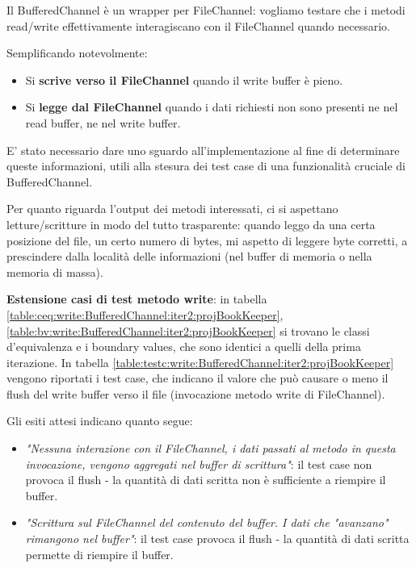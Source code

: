 \documentclass[10pt, a4paper]{article}
\newcommand{\gettablelabel}[5]{table:#1:#2:#3:iter#4:proj#5}
\def\bookkeeper{BookKeeper}
\begin{document}
	Il BufferedChannel è un wrapper per FileChannel: vogliamo testare che i metodi read/write effettivamente
	interagiscano con il FileChannel quando necessario.
	
	Semplificando notevolmente:
	\begin{itemize}
		\item Si \textbf{scrive verso il FileChannel} quando il write buffer è pieno.
		\item Si \textbf{legge dal FileChannel} quando i dati richiesti non sono presenti ne nel 
		read buffer, ne nel write buffer.
	\end{itemize}
	
	E' stato necessario dare uno sguardo
	all'implementazione al fine di determinare queste informazioni, utili alla stesura dei test case di una
	funzionalità cruciale di BufferedChannel.
	
	Per quanto riguarda l'output dei metodi interessati, ci si aspettano letture/scritture in modo del tutto
	trasparente: quando leggo da una certa posizione del file, un certo numero di bytes, mi aspetto di leggere
	byte corretti, a prescindere dalla località delle informazioni (nel buffer di memoria o nella memoria di
	massa).
	
	\textbf{Estensione casi di test metodo write}: in tabella 
	\ref{\gettablelabel{ceq}{write}{BufferedChannel}{2}{\bookkeeper}},
	\ref{\gettablelabel{bv}{write}{BufferedChannel}{2}{\bookkeeper}} si trovano le classi d'equivalenza e i
	boundary values, che sono identici a quelli della prima iterazione.
	In tabella \ref{\gettablelabel{testc}{write}{BufferedChannel}{2}{\bookkeeper}} vengono riportati i test
	case, che indicano il valore che può causare o meno il flush del write buffer verso il file (invocazione
	metodo write di FileChannel).
	
	Gli esiti attesi indicano quanto segue:
	\begin{itemize}
		\item \textit{"Nessuna interazione con il FileChannel, 
		i dati passati al metodo in questa invocazione, vengono
		aggregati nel buffer di scrittura"}: il test case non provoca il flush -
		la quantità di dati scritta non è sufficiente a riempire il buffer.
		\item \textit{"Scrittura sul FileChannel del contenuto
		del buffer. I dati che "avanzano" rimangono nel buffer"}: il test case 
		provoca il flush - la quantità di dati scritta permette di riempire il
		buffer.
	\end{itemize}
	
\end{document}

